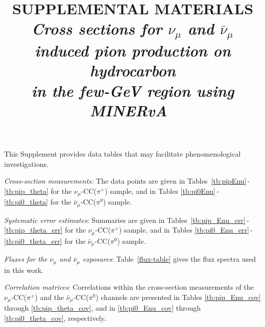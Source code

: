 \documentclass[aps, prd, reprint,showpacs,  preprintnumbers,amsmath,amssymb,superscriptaddress, nofootinbib]{revtex4-1}
\newcommand{\numu}{\mbox{$\nu_{\mu}$}}                   %
\newcommand{\anumu}{\ensuremath{\bar{\nu}_{\mu}}}
\newcommand{\minerva}{MINERvA~}
\begin{document}



\title{SUPPLEMENTAL MATERIALS\\ {\it Cross sections for $\numu$ and $\anumu$ induced pion production on hydrocarbon\\ 
in the few-GeV region using \minerva}}    

\smallskip
\vspace{10pt}   

\begin{abstract}
\end{abstract}


\maketitle


This Supplement provides data tables that may facilitate phenomenological investigations.

\smallskip
\noindent
{\it Cross-section measurements:}  The data points are given in Tables~\ref{tb:pipEnu}\,-\,\ref{tb:pip_theta} 
for the $\numu$-CC($\pi^{+}$) sample, and in
Tables \ref{tb:pi0Enu}\,-\,\ref{tb:pi0_theta}
for the $\anumu$-CC($\pi^{0}$) sample.     

\smallskip
\noindent
{\it Systematic error estimates}:  Summaries are given in Tables~\ref{tb:pip_Enu_err}\,-\,\ref{tb:pip_theta_err}
for the $\numu$-CC($\pi^{+}$) sample, and in Tables \ref{tb:pi0_Enu_err}\,-\,\ref{tb:pi0_theta_err}
for the $\anumu$-CC($\pi^{0}$) sample.

\smallskip
\noindent
{\it Fluxes for the $\numu$ and $\anumu$ exposures}:  Table~\ref{flux-table} gives the flux spectra used in this work.


\smallskip
\noindent
{\it Correlation matrices}: Correlations within the cross-section measurements of the $\numu$-CC($\pi^{+}$) and
the $\anumu$-CC($\pi^{0}$) channels are presented in 
Tables \ref{tb:pip_Enu_cov} through \ref{tb:pip_theta_cov}, and in \ref{tb:pi0_Enu_cov} through \ref{tb:pi0_theta_cov}, respectively.

\end{document}
